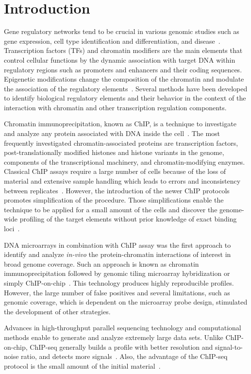 \chapter*{Introduction}

Gene regulatory networks tend to be crucial in various genomic studies such as gene expression, cell type identification and differentiation, and disease~\cite{collas2010current}. 
Transcription factors (TFs) and chromatin modifiers are the main elements that control cellular functions by the dynamic association with target DNA within regulatory regions such as promoters and enhancers and their coding sequences.
Epigenetic modifications change the composition of the chromatin and modulate the association of the regulatory elements~\cite{antequera2003structure, kouzarides2007chromatin, mito2007histone}.
Several methods have been developed to identify biological regulatory elements and their behavior in the context of the interaction with chromatin and other transcription regulation components. 

Chromatin immunoprecipitation, known as ChIP, is a technique to investigate and analyze any protein associated with DNA inside the cell~\cite{o1995histone, o1996immunoprecipitation, nelson2006protocol}.
The most frequently investigated chromatin-associated proteins are transcription factors, post-translationally modified histones and histone variants in the genome, components of the transcriptional machinery, and chromatin-modifying enzymes.
Classical ChIP assays require a large number of cells because of the loss of material and extensive sample handling which leads to errors and inconsistency between replicates~\cite{o1996immunoprecipitation}. 
However, the introduction of the newer ChIP protocols promotes simplification of the procedure. 
Those simplifications enable the technique to be applied for a small amount of the cells and discover the genome-wide profiling of the target elements without prior knowledge of exact binding loci~\cite{collas2010current}. 

DNA microarrays in combination with ChIP assay was the first approach to identify and analyze \textit{in-vivo} the protein-chromatin interactions of interest in broad genome coverage. 
Such an approach is known as chromatin immunoprecipitation followed by genomic tiling microarray hybridization or simply ChIP-on-chip~\cite{ren2000genome, loden2005whole}. 
This technology produces highly reproducible profiles.
However, the large number of false positives and several limitations, such as genomic coverage, which is dependent on the microarray probe design, stimulated the development of other strategies. 

Advances in high-throughput parallel sequencing technology and computational methods enable to generate and analyze extremely large data sets. 
Unlike ChIP-on-chip, ChIP-seq generally builds a profile with better resolution and signal-to-noise ratio, and detects more signals~\cite{park2009chip}.
Also, the advantage of the ChIP-seq protocol is the small amount of the initial material~\cite{adli2010genome}.